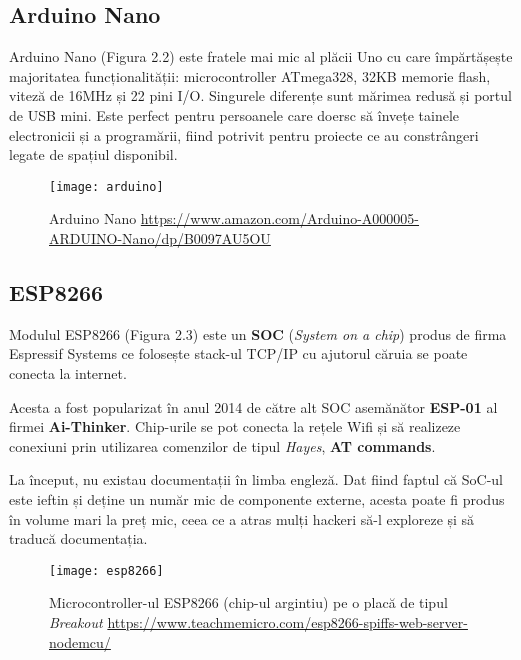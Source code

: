 \subsection{Arduino Nano}

Arduino Nano (Figura 2.2) este fratele mai mic al plăcii Uno cu care împărtășește majoritatea funcționalității: microcontroller ATmega328, 32KB memorie flash, viteză de 16MHz și 22 pini I/O.  Singurele diferențe sunt mărimea redusă și portul de USB mini. Este perfect pentru persoanele care doersc să învețe tainele electronicii și a programării, fiind potrivit pentru proiecte ce au constrângeri legate de spațiul disponibil.

\begin{figure}[h]
	\centering
	\texttt{[image: arduino]}
	\caption{Arduino Nano \newline\url{https://www.amazon.com/Arduino-A000005-ARDUINO-Nano/dp/B0097AU5OU}}
	\label{fig:arduino}
\end{figure}

\subsection{ESP8266}

Modulul ESP8266 (Figura 2.3) este un \textbf{SOC} (\emph{System on a chip}) produs de firma Espressif Systems ce folosește stack-ul TCP/IP cu ajutorul căruia se poate conecta la internet.

Acesta a fost popularizat în anul 2014 de către alt SOC asemănător \textbf{ESP-01} al firmei \textbf{Ai-Thinker}. Chip-urile se pot conecta la rețele Wifi și să realizeze conexiuni prin utilizarea comenzilor de tipul \emph{Hayes}, \textbf{AT commands}.

La început, nu existau documentații în limba engleză. Dat fiind faptul că SoC-ul este ieftin și deține un număr mic de componente externe, acesta poate fi produs în volume mari la preț mic, ceea ce a atras mulți hackeri să-l exploreze și să traducă documentația. 

\begin{figure}[h]
	\centering
	\texttt{[image: esp8266]}
	\caption{Microcontroller-ul ESP8266 (chip-ul argintiu) pe o placă de tipul \emph{Breakout} \newline\url{https://www.teachmemicro.com/esp8266-spiffs-web-server-nodemcu/}}
	\label{fig:esp8266}
\end{figure}

\break

